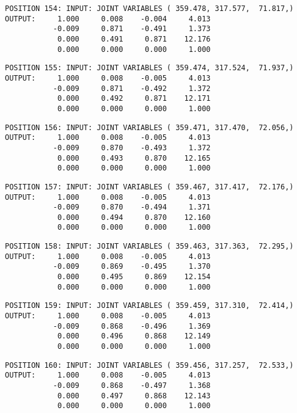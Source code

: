 \begin{verbatim}
POSITION 154: INPUT: JOINT VARIABLES ( 359.478, 317.577,  71.817,)
OUTPUT:     1.000     0.008    -0.004     4.013
           -0.009     0.871    -0.491     1.373
            0.000     0.491     0.871    12.176
            0.000     0.000     0.000     1.000
\end{verbatim} \pagebreak[1]\begin{verbatim}
POSITION 155: INPUT: JOINT VARIABLES ( 359.474, 317.524,  71.937,)
OUTPUT:     1.000     0.008    -0.005     4.013
           -0.009     0.871    -0.492     1.372
            0.000     0.492     0.871    12.171
            0.000     0.000     0.000     1.000
\end{verbatim} \pagebreak[1]\begin{verbatim}
POSITION 156: INPUT: JOINT VARIABLES ( 359.471, 317.470,  72.056,)
OUTPUT:     1.000     0.008    -0.005     4.013
           -0.009     0.870    -0.493     1.372
            0.000     0.493     0.870    12.165
            0.000     0.000     0.000     1.000
\end{verbatim} \pagebreak[1]\begin{verbatim}
POSITION 157: INPUT: JOINT VARIABLES ( 359.467, 317.417,  72.176,)
OUTPUT:     1.000     0.008    -0.005     4.013
           -0.009     0.870    -0.494     1.371
            0.000     0.494     0.870    12.160
            0.000     0.000     0.000     1.000
\end{verbatim} \pagebreak[1]\begin{verbatim}
POSITION 158: INPUT: JOINT VARIABLES ( 359.463, 317.363,  72.295,)
OUTPUT:     1.000     0.008    -0.005     4.013
           -0.009     0.869    -0.495     1.370
            0.000     0.495     0.869    12.154
            0.000     0.000     0.000     1.000
\end{verbatim} \pagebreak[1]\begin{verbatim}
POSITION 159: INPUT: JOINT VARIABLES ( 359.459, 317.310,  72.414,)
OUTPUT:     1.000     0.008    -0.005     4.013
           -0.009     0.868    -0.496     1.369
            0.000     0.496     0.868    12.149
            0.000     0.000     0.000     1.000
\end{verbatim} \pagebreak[1]\begin{verbatim}
POSITION 160: INPUT: JOINT VARIABLES ( 359.456, 317.257,  72.533,)
OUTPUT:     1.000     0.008    -0.005     4.013
           -0.009     0.868    -0.497     1.368
            0.000     0.497     0.868    12.143
            0.000     0.000     0.000     1.000
\end{verbatim} \pagebreak[1]\begin{verbatim}

\end{verbatim}
